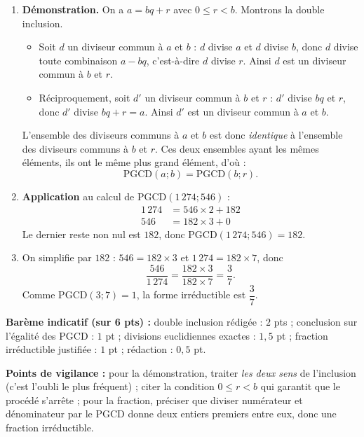 \documentclass[11pt]{article}
\begin{document}
\begin{corrige}
\begin{enumerate}
    \item \textbf{Démonstration.} On a $a = bq + r$ avec $0 \leq r < b$. Montrons la double inclusion.
    \begin{itemize}
        \item Soit $d$ un diviseur commun à $a$ et $b$ : $d$ divise $a$ et $d$ divise $b$, donc $d$ divise toute combinaison $a - bq$, c'est-à-dire $d$ divise $r$. Ainsi $d$ est un diviseur commun à $b$ et $r$.
        \item Réciproquement, soit $d'$ un diviseur commun à $b$ et $r$ : $d'$ divise $bq$ et $r$, donc $d'$ divise $bq + r = a$. Ainsi $d'$ est un diviseur commun à $a$ et $b$.
    \end{itemize}
    L'ensemble des diviseurs communs à $a$ et $b$ est donc \emph{identique} à l'ensemble des diviseurs communs à $b$ et $r$. Ces deux ensembles ayant les mêmes éléments, ils ont le même plus grand élément, d'où :
    \[ \text{PGCD}(a ; b) = \text{PGCD}(b ; r). \]
    \item \textbf{Application} au calcul de $\text{PGCD}(1\,274 ; 546)$ :
    \begin{align*}
    1\,274 &= 546 \times 2 + 182 \\
    546 &= 182 \times 3 + 0
    \end{align*}
    Le dernier reste non nul est $182$, donc $\text{PGCD}(1\,274 ; 546) = 182$.
    \item On simplifie par $182$ : $546 = 182 \times 3$ et $1\,274 = 182 \times 7$, donc
    \[ \dfrac{546}{1\,274} = \dfrac{182 \times 3}{182 \times 7} = \dfrac{3}{7}. \]
    Comme $\text{PGCD}(3 ; 7) = 1$, la forme irréductible est $\dfrac{3}{7}$.
\end{enumerate}
\textbf{Barème indicatif (sur 6 pts) :} double inclusion rédigée : $2$ pts ; conclusion sur l'égalité des PGCD : $1$ pt ; divisions euclidiennes exactes : $1{,}5$ pt ; fraction irréductible justifiée : $1$ pt ; rédaction : $0{,}5$ pt.

\textbf{Points de vigilance :} pour la démonstration, traiter \emph{les deux sens} de l'inclusion (c'est l'oubli le plus fréquent) ; citer la condition $0 \leq r < b$ qui garantit que le procédé s'arrête ; pour la fraction, préciser que diviser numérateur et dénominateur par le PGCD donne deux entiers premiers entre eux, donc une fraction irréductible.
\end{corrige}
\end{document}
